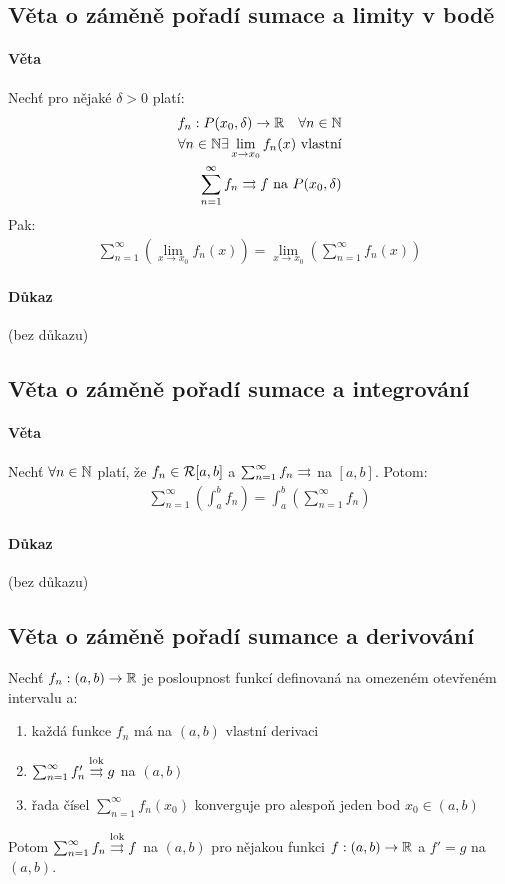 \documentclass[a4paper,10pt]{article}
\begin{document}
\subsection{Věta o záměně pořadí sumace a limity v bodě}
\setcounter{equation}{0}
\paragraph{Věta}
Nechť pro nějaké $\delta > 0$ platí:
\begin{align*}
	f_n : P(x_0, \delta) \to \mathbb{R} \quad \forall n \in \mathbb{N} \\
	\forall n \in \mathbb{N} \exists \lim_{x\to x_0} f_n(x) \text{ vlastní}\\
	\sum_{n=1}^\infty f_n \rightrightarrows f \text{ na } P(x_0, \delta)
\end{align*}
Pak:
\begin{align*}
	\sum_{n=1}^\infty \left( \lim_{x\to x_0} f_n(x) \right) = \lim_{x\to x_0} 
	\left( \sum_{n=1}^\infty f_n(x) \right)
\end{align*}
\paragraph{Důkaz}
(bez důkazu)



\subsection{Věta o záměně pořadí sumace a integrování}
\setcounter{equation}{0}
\paragraph{Věta}
Nechť $\forall n \in \mathbb{N}$ platí, že $f_n \in\mathcal{R}[a,b]$ a 
$\sum_{n=1}^\infty f_n \rightrightarrows$ na $[a,b]$. Potom:
\begin{align*}
	\sum_{n=1}^\infty \left( \int_a^b f_n \right) = \int_a^b \left(
	\sum_{n=1}^\infty f_n \right)
\end{align*}
\paragraph{Důkaz}
(bez důkazu)


\subsection{Věta o záměně pořadí sumance a derivování}
\setcounter{equation}{0}
Nechť $f_n : (a,b) \to \mathbb{R}$ je posloupnost funkcí definovaná na omezeném
otevřeném intervalu a:
\begin{enumerate}
	\item každá funkce $f_n$ má na $(a,b)$ vlastní derivaci
	\item $\sum_{n=1}^\infty f_n' \overset{\text{lok}}{\rightrightarrows} g$ na $(a,b)$
	\item řada čísel $\sum_{n=1}^\infty f_n(x_0)$ konverguje pro alespoň jeden bod 
		$x_0	\in (a,b)$
\end{enumerate}
Potom $\sum_{n=1}^\infty f_n \overset{\text{lok}}{\rightrightarrows} f$ na $(a,b)$ pro nějakou funkci $f:(a,b) \to
\mathbb{R}$ a $f' = g$ na $(a,b)$.
\end{document}
